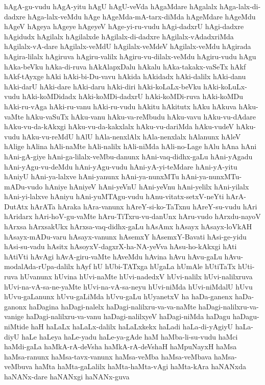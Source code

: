 {hAgA-gu-vudu
hAgA-yitu
hAgU
hAgU-veVda
hAgaMdare
hAgalalx
hAga-lalx-di-dadxre
hAga-lalx-veMdu
hAge
hAgeMda-mA-tarx-diMda
hAgeMdare
hAgeMdu
hAgeV
hAgeya
hAgeye
hAgeyeV
hAge-yi-ru-vudu
hAgi-dadxrU
hAgi-dadxre
hAgidudx
hAgilalx
hAgilalxde
hAgilalx-di-dadxre
hAgilalx-vAdadxriMda
hAgilalx-vA-dare
hAgilalx-veMdU
hAgilalx-veMdeV
hAgilalx-veMdu
hAgirada
hAgira-lilalx
hAgiruva
hAgiru-valilx
hAgiru-vu-dilalx-veMdu
hAgiru-vudu
hAgu
hAka-beVku
hAka-di-ruva
hAkAlapxDalu
hAkalu
hAka-takakx-vaSeTx
hAkf
hAkf-tAyxge
hAki
hAki-bi-Du-vavu
hAkida
hAkidadx
hAki-dalilx
hAki-danu
hAki-darU
hAki-dare
hAki-daru
hAki-diri
hAki-koLaLx-beVku
hAki-koLuLx-vudu
hAki-koMDidadx
hAki-koMDi-dadxrU
hAki-koMDi-ruva
hAki-koMDu
hAki-ru-vAga
hAki-ru-vanu
hAki-ru-vudu
hAkitu
hAkitutx
hAku
hAkuva
hAku-vaMte
hAku-vaSuTx
hAku-vanu
hAku-va-reMbudu
hAku-vavu
hAku-vu-dAdare
hAku-vu-da-kAkxgi
hAku-vu-da-kakxlalx
hAku-vu-dariMda
hAku-vudeV
hAku-vudu
hAku-vu-reMdU
hAlU
hAla-nenxlAlx
hAla-nenxlalx
hAlanunx
hAleV
hAlige
hAlina
hAli-naMte
hAli-nalilx
hAli-niMda
hAli-no-Lage
hAlu
hAna
hAni
hAni-gA-giye
hAni-ga-lilalx-veMbu-danunx
hAni-vaq-didhx-gaLu
hAni-yAgadu
hAni-yAgu-vu-deMdu
hAni-yAgu-vudu
hAni-yA-yi-teMdare
hAni-yA-yitu
hAniyU
hAni-ya-lalxve
hAni-yanunx
hAni-ya-nunxMTu
hAni-ya-nunxMTu-mADu-vudo
hAniye
hAniyeV
hAni-yeVnU
hAni-yeVnu
hAni-yelilx
hAni-yilalx
hAni-yi-lalxve
hAniyu
hAni-yuMTAgu-vudu
hAnu-vitatx-setxV-neYti
hArA-DutAtx
hArATa
hAraka
hAra-vanunx
hAreY-si-ko-TaTxnu
hAreY-su-vudu
hAri
hAridarx
hAri-hoV-gu-vaMte
hAru-TiTxru-vu-danUnx
hAru-vudo
hArxdu-nayoV
hArxsa
hArxsakUkx
hArxsa-vaq-didhx-gaLu
hAsAmx
hAsayx
hAsayx-loVkAH
hAsayx-mADu-varu
hAsayx-vanunx
hAsemxY
hAsemxY-Bavati
hAsi-ge-yidu
hAsi-su-vadu
hAsitx
hAsoyxV-dagxrX-ha-NA-yeVva
hAsu-ho-kAkxgi
hAti
hAtiVti
hAvAgi
hAvA-giru-vaMte
hAveMdu
hAvina
hAvu
hAvu-gaLu
hAvu-modalAda-rUpa-dalilx
hAyf
hU
hUbi-TATxga
hUgaLa
hUmAle
hUtiTaTx
hUti-ruva
hUvanunx
hUvina
hUvi-naMte
hUvi-nadedxV
hUvi-nalilx
hUvi-nalilxruva
hUvi-na-vA-sa-ne-yaMte
hUvi-na-vA-sa-neyu
hUvi-niMda
hUvi-niMdalU
hUvu
hUvu-gaLanunx
hUvu-gaLiMda
hUvu-gaLu
hUyanetxV
ha
haDa-ganenx
haDa-ganonx
haDagina
haDagi-nalelx
haDagi-nalilxru-va-va-naMte
haDagi-nalilxru-va-vanige
haDagi-nalilxru-va-vanu
haDagi-nalilxyeV
haDagi-niMda
haDagu
haDagu-niMtide
haH
haLaLx
haLaLx-dalilx
haLaLxkekx
haLadi
haLa-di-yAgiyU
haLa-diyU
haLe
haLeya
haLe-yadu
haLe-ya-gAde
haM
haMba-li-su-vudu
haMci
haMdi-gaLa
haMkA-rA-deVsha
haMkA-rA-deVshaH
haMpuNayxH
haMsa
haMsa-ranunx
haMsa-tavx-vanunx
haMsa-veMba
haMsa-veMbava
haMsa-veMbuva
haMta
haMta-gaLalilx
haMta-haMta-vAgi
haMta-kAra
haNANxda
haNANx-dare
haNANxgi
haNANx-guva
}
